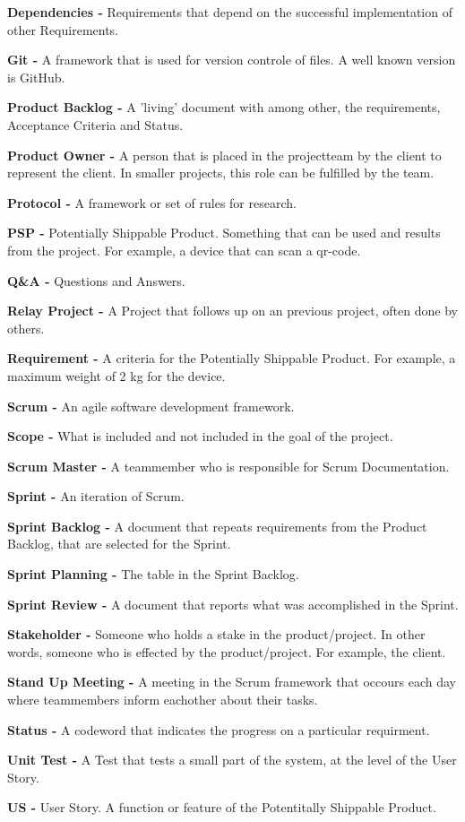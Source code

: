 \documentclass[10pt]{report}
\begin{document}
\noindent\textbf{Dependencies -} Requirements that depend on the successful implementation of other Requirements.

\noindent\textbf{Git -} A framework that is used for version controle of files. A well known version is GitHub.

\noindent\textbf{Product Backlog -} A 'living' document with among other, the requirements, Acceptance Criteria and Status.

\noindent\textbf{Product Owner -} A person that is placed in the projectteam by the client to represent the client. In smaller projects, this role can be fulfilled by the team.

\noindent\textbf{Protocol -} A framework or set of rules for research.

\noindent\textbf{PSP -} Potentially Shippable Product. Something that can be used and results from the project. For example, a device that can scan a qr-code.

\noindent\textbf{Q\&A -} Questions and Answers.

\noindent\textbf{Relay Project -} A Project that follows up on an previous project, often done by others.

\noindent\textbf{Requirement -} A criteria for the Potentially Shippable Product. For example, a maximum weight of 2 kg for the device.

\noindent\textbf{Scrum -} An agile software development framework.

\noindent\textbf{Scope -} What is included and not included in the goal of the project.

\noindent\textbf{Scrum Master -} A teammember who is responsible for Scrum Documentation.

\noindent\textbf{Sprint -} An iteration of Scrum.

\noindent\textbf{Sprint Backlog -} A document that repeats requirements from the Product Backlog, that are selected for the Sprint.

\noindent\textbf{Sprint Planning -} The table in the Sprint Backlog.

\noindent\textbf{Sprint Review -} A document that reports what was accomplished in the Sprint.

\noindent\textbf{Stakeholder -} Someone who holds a stake in the product/project. In other words, someone who is effected by the product/project. For example, the client.

\noindent\textbf{Stand Up Meeting -} A meeting in the Scrum framework that occours each day where teammembers inform eachother about their tasks.

\noindent\textbf{Status -} A codeword that indicates the progress on a particular requirment.

\noindent\textbf{Unit Test -} A Test that tests a small part of the system, at the level of the User Story.

\noindent\textbf{US -} User Story. A function or feature of the Potentitally Shippable Product.


\newpage
\end{document}
